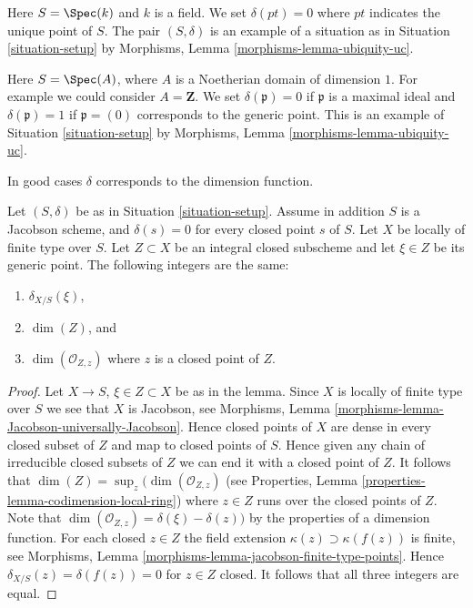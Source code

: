 \begin{example}
\label{example-field}
Here $S = \Spec(k)$ and $k$ is a field.
We set $\delta(pt) = 0$ where $pt$ indicates the unique point of $S$.
The pair $(S, \delta)$ is an example of a situation as in
Situation \ref{situation-setup} by
Morphisms, Lemma \ref{morphisms-lemma-ubiquity-uc}.
\end{example}

\begin{example}
\label{example-domain-dimension-1}
Here $S = \Spec(A)$, where $A$ is a Noetherian domain
of dimension $1$.
For example we could consider $A = \mathbf{Z}$.
We set $\delta(\mathfrak p) = 0$ if
$\mathfrak p$ is a maximal ideal and $\delta(\mathfrak p) = 1$
if $\mathfrak p = (0)$ corresponds to the generic point.
This is an example of Situation \ref{situation-setup} by
Morphisms, Lemma \ref{morphisms-lemma-ubiquity-uc}.
\end{example}

\noindent
In good cases $\delta$ corresponds to the dimension function.

\begin{lemma}
\label{lemma-delta-is-dimension}
Let $(S, \delta)$ be as in Situation \ref{situation-setup}.
Assume in addition $S$ is a Jacobson scheme, and $\delta(s) = 0$ for every
closed point $s$ of $S$. Let $X$ be locally of finite type over $S$.
Let $Z \subset X$ be an integral closed subscheme and let
$\xi \in Z$ be its generic point. The following integers are the same:
\begin{enumerate}
\item $\delta_{X/S}(\xi)$,
\item $\dim(Z)$, and
\item $\dim(\mathcal{O}_{Z, z})$ where $z$ is a closed point of $Z$.
\end{enumerate}
\end{lemma}

\begin{proof}
Let $X \to S$, $\xi \in Z \subset X$ be as in the lemma.
Since $X$ is locally of finite type over $S$ we see that
$X$ is Jacobson, see
Morphisms, Lemma \ref{morphisms-lemma-Jacobson-universally-Jacobson}.
Hence closed points of $X$ are dense in every closed subset of $Z$
and map to closed points of $S$. Hence given any chain
of irreducible closed subsets of $Z$ we can end it with a closed point of $Z$.
It follows that $\dim(Z) = \sup_z(\dim(\mathcal{O}_{Z, z})$
(see Properties, Lemma \ref{properties-lemma-codimension-local-ring})
where $z \in Z$ runs over the closed points of $Z$.
Note that $\dim(\mathcal{O}_{Z, z}) = \delta(\xi) - \delta(z))$
by the properties of a dimension function.
For each closed $z \in Z$ the field extension
$\kappa(z) \supset \kappa(f(z))$ is finite, see Morphisms,
Lemma \ref{morphisms-lemma-jacobson-finite-type-points}.
Hence $\delta_{X/S}(z) = \delta(f(z)) = 0$ for $z \in Z$ closed.
It follows that all three integers are equal.
\end{proof}

